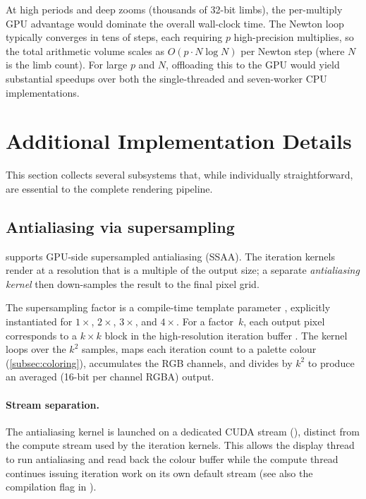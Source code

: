 At high periods and deep zooms (thousands of 32-bit limbs), the per-multiply
GPU advantage would dominate the overall wall-clock time.  The Newton loop
typically converges in tens of steps, each requiring $p$ high-precision
multiplies, so the total arithmetic volume scales as $O(p \cdot N \log N)$ per
Newton step (where $N$ is the limb count).  For large $p$ and $N$, offloading
this to the GPU would yield substantial speedups over both the single-threaded
and seven-worker CPU implementations.

\section{Additional Implementation Details}
\label{sec:misc-details}

This section collects several subsystems that, while individually
straightforward, are essential to the complete rendering pipeline.

\subsection{Antialiasing via supersampling}
\label{subsec:antialiasing}

\FractalShark{} supports GPU-side supersampled antialiasing (SSAA).
The iteration kernels render at a resolution that is a multiple of
the output size; a separate \emph{antialiasing kernel} then
down-samples the result to the final pixel grid.

The supersampling factor is a compile-time template parameter
, explicitly instantiated for $1\times$, $2\times$,
$3\times$, and $4\times$.  For a factor~$k$, each output pixel
corresponds to a $k\times k$ block in the high-resolution iteration
buffer .  The kernel loops over the $k^2$
samples, maps each iteration count to a palette colour
(\cref{subsec:coloring}), accumulates the RGB channels, and divides
by $k^2$ to produce an averaged  (16-bit per channel
RGBA) output.

\paragraph{Stream separation.}
The antialiasing kernel is launched on a dedicated CUDA stream
(), distinct from the compute stream used by the
iteration kernels.  This allows the display thread to run
antialiasing and read back the colour buffer while the compute thread
continues issuing iteration work on its own default stream
(see also the 
compilation flag in ).

